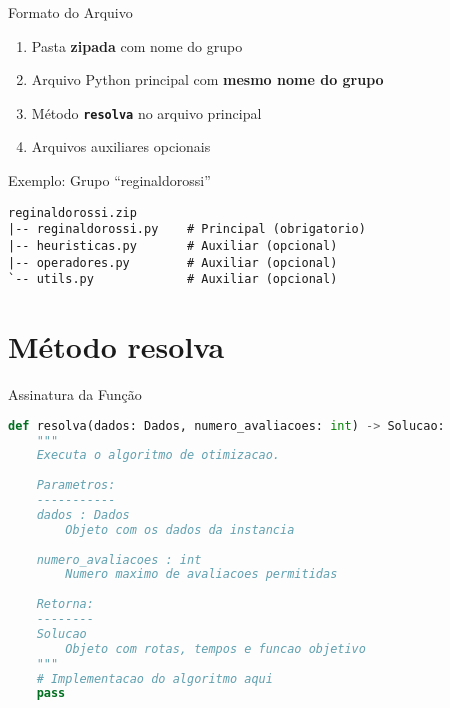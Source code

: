 \documentclass[10pt]{beamer}
\begin{document}
\begin{frame}[fragile]{Formato do Arquivo}
    \begin{enumerate}
        \item Pasta \textbf{zipada} com nome do grupo
        \item Arquivo Python principal com \textbf{mesmo nome do grupo}
        \item Método \texttt{\textbf{resolva}} no arquivo principal
        \item Arquivos auxiliares opcionais
    \end{enumerate}
    
    \vspace{0.5cm}
    
    \begin{exampleblock}{Exemplo: Grupo ``reginaldorossi''}
        \begin{verbatim}
reginaldorossi.zip
|-- reginaldorossi.py    # Principal (obrigatorio)
|-- heuristicas.py       # Auxiliar (opcional)
|-- operadores.py        # Auxiliar (opcional)
`-- utils.py             # Auxiliar (opcional)
        \end{verbatim}
    \end{exampleblock}
\end{frame}

\section{Método resolva}

\begin{frame}[fragile]{Assinatura da Função}
    \begin{lstlisting}[language=Python]
def resolva(dados: Dados, numero_avaliacoes: int) -> Solucao:
    """
    Executa o algoritmo de otimizacao.
    
    Parametros:
    -----------
    dados : Dados
        Objeto com os dados da instancia
    
    numero_avaliacoes : int
        Numero maximo de avaliacoes permitidas
    
    Retorna:
    --------
    Solucao
        Objeto com rotas, tempos e funcao objetivo
    """
    # Implementacao do algoritmo aqui
    pass
    \end{lstlisting}
\end{frame}
\end{document}

